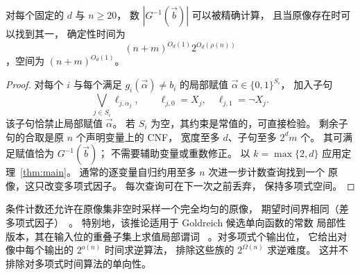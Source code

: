 \begin{corollary}\label{cor:consequence-local-inversion}
对每个固定的 $d$ 与 $n\ge20$，
数 $|G^{-1}(\vec{b})|$ 可以被精确计算，
且当原像存在时可以找到其一，
确定性时间为
\[
 (n+m)^{O_d(1)}2^{O_d(\rho(n))}
\]
，空间为 $(n+m)^{O_d(1)}$。
\end{corollary}
\begin{proof}
对每个 $i$ 与每个满足 $g_i(\vec{\alpha})\ne b_i$
的局部赋值 $\vec{\alpha}\in\{0,1\}^{S_i}$，
加入子句
\[
 \bigvee_{j\in S_i}\ell_{j,\alpha_j},
 \qquad
 \ell_{j,0}=X_j,\quad \ell_{j,1}=\neg X_j.
\]
该子句恰禁止局部赋值 $\vec{\alpha}$。
若 $S_i$ 为空，其约束是常值的，可直接检验。
剩余子句的合取是原 $n$ 个声明变量上的 CNF，
宽度至多 $d$、子句至多 $2^d m$ 个。
其可满足赋值恰为 $G^{-1}(\vec{b})$；
不需要辅助变量或重数修正。
以 $k=\max\{2,d\}$ 应用定理~\ref{thm:main}。
通常的逐变量自归约用至多 $n$ 次进一步计数查询找到一个
原像，这只改变多项式因子。
每次查询可在下一次之前丢弃，
保持多项式空间。
\end{proof}

条件计数还允许在原像集非空时采样一个完全均匀的原像，
期望时间界相同（差多项式因子）~\cite{JVV86}。
特别地，该推论适用于 Goldreich 候选单向函数的常数
局部性版本，其在输入位的重叠子集上求值局部谓词
~\cite{Gol00}。对多项式个输出位，
它给出对像中每个输出的 $2^{o(n)}$ 时间求逆算法，
排除这些族的 $2^{\Omega(n)}$ 求逆难度。
这并不排除对多项式时间算法的单向性。




